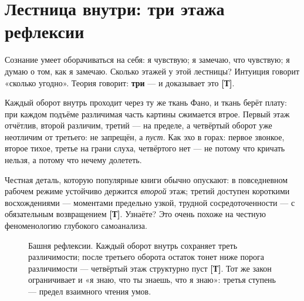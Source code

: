 \documentclass[11pt,letterpaper]{article}
\newcommand{\stT}{\textbf{[Т]}\xspace}
\begin{document}
\section{Лестница внутри: три этажа рефлексии}
\label{sec:tower}

Сознание умеет оборачиваться на себя: я чувствую; я замечаю, что
чувствую; я думаю о том, как я замечаю. Сколько этажей у этой
лестницы? Интуиция говорит «сколько угодно». Теория говорит:
\textbf{три} --- и доказывает это \stT.

Каждый оборот внутрь проходит через ту же ткань Фано, и ткань берёт
плату: при каждом подъёме различимая часть картины сжимается втрое.
Первый этаж отчётлив, второй различим, третий --- на пределе, а
четвёртый оборот уже неотличим от третьего: не запрещён, а
\emph{пуст}. Как эхо в горах: первое звонкое, второе тихое, третье
на грани слуха, четвёртого нет --- не потому что кричать нельзя, а
потому что нечему долететь.

Честная деталь, которую популярные книги обычно опускают: в
повседневном рабочем режиме устойчиво держится \emph{второй} этаж;
третий доступен короткими восхождениями --- моментами предельно
узкой, трудной сосредоточенности --- с обязательным возвращением
\stT. Узнаёте? Это очень похоже на честную феноменологию глубокого
самоанализа.

\begin{figure}[H]
\centering
{}
\caption{Башня рефлексии. Каждый оборот внутрь сохраняет треть
различимости; после третьего оборота остаток тонет ниже порога
различимости --- четвёртый этаж структурно пуст \stT. Тот же закон
ограничивает и «я знаю, что ты знаешь, что я знаю»: третья ступень ---
предел взаимного чтения умов.}
\label{fig:tower}
\end{figure}
\end{document}
